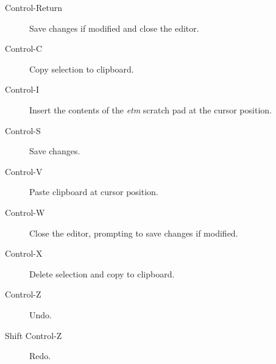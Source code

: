 \documentclass[]{article}
\begin{document}
\begin{description}
\item[Control-Return]
Save changes if modified and close the editor.
\item[Control-C]
Copy selection to clipboard.
\item[Control-I]
Insert the contents of the \emph{etm} scratch pad at the cursor
position.
\item[Control-S]
Save changes.
\item[Control-V]
Paste clipboard at cursor position.
\item[Control-W]
Close the editor, prompting to save changes if modified.
\item[Control-X]
Delete selection and copy to clipboard.
\item[Control-Z]
Undo.
\item[Shift Control-Z]
Redo.
\end{description}
\end{document}
